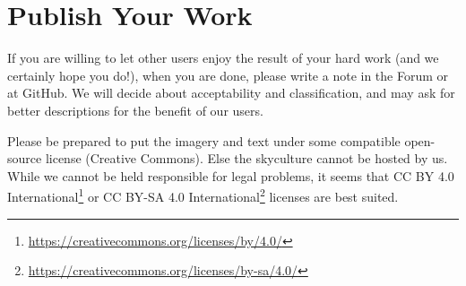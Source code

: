 \section{Publish Your Work}
\label{sec:skyculture:publish}

If you are willing to let other users enjoy the result of your hard
work (and we certainly hope you do!), when you are done, please write
a note in the Forum or at GitHub. We will decide about acceptability
and classification, and may ask for better descriptions for the
benefit of our users.

Please be prepared to put the imagery and text
under some compatible open-source license (Creative Commons). Else the
skyculture cannot be hosted by us.
While we cannot be held responsible for legal problems, it seems that
CC BY 4.0
International\footnote{\url{https://creativecommons.org/licenses/by/4.0/}}
or CC BY-SA 4.0
International\footnote{\url{https://creativecommons.org/licenses/by-sa/4.0/}}
licenses are best suited.



